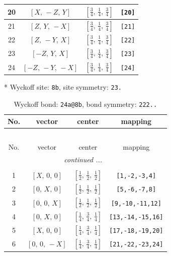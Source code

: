 \documentclass[fleqn,8pt]{jsarticle}
\begin{document}
\begin{longtable}{cccc}
20 & $\left[ X,\, - Z,\, Y \right]$ & $\left[ \frac{3}{4},\, \frac{1}{4},\, \frac{3}{4} \right]$ & {\tt [20]} \\ \hline
21 & $\left[ Z,\, Y,\, - X \right]$ & $\left[ \frac{3}{4},\, \frac{1}{4},\, \frac{3}{4} \right]$ & {\tt [21]} \\ \hline
22 & $\left[ Z,\, - Y,\, X \right]$ & $\left[ \frac{3}{4},\, \frac{1}{4},\, \frac{3}{4} \right]$ & {\tt [22]} \\ \hline
23 & $\left[ - Z,\, Y,\, X \right]$ & $\left[ \frac{3}{4},\, \frac{1}{4},\, \frac{3}{4} \right]$ & {\tt [23]} \\ \hline
24 & $\left[ - Z,\, - Y,\, - X \right]$ & $\left[ \frac{3}{4},\, \frac{1}{4},\, \frac{3}{4} \right]$ & {\tt [24]} \\
\end{longtable}
* Wyckoff site: {\tt 8b}, site symmetry: {\tt 23.}
\renewcommand{\arraystretch}{1.2}
\begin{longtable}{cccc}
\caption{Wyckoff bond: {\tt 24a@8b}, bond symmetry: {\tt 222..}}
 \\
 \hline \hline
No. & vector & center & mapping \\ \hline \endfirsthead

\multicolumn{3}{l}{\tablename\ \thetable{}} \\
 \hline \hline
No. & vector & center & mapping \\ \hline \endhead

 \hline \hline
\multicolumn{3}{r}{\footnotesize\it continued ...} \\ \endfoot

 \hline \hline
\multicolumn{3}{r}{} \\ \endlastfoot

1 & $\left[ X,\, 0,\, 0 \right]$ & $\left[ \frac{1}{2},\, \frac{1}{2},\, \frac{1}{2} \right]$ & {\tt [1,-2,-3,4]} \\ \hline
2 & $\left[ 0,\, X,\, 0 \right]$ & $\left[ \frac{1}{2},\, \frac{1}{2},\, \frac{1}{2} \right]$ & {\tt [5,-6,-7,8]} \\ \hline
3 & $\left[ 0,\, 0,\, X \right]$ & $\left[ \frac{1}{2},\, \frac{1}{2},\, \frac{1}{2} \right]$ & {\tt [9,-10,-11,12]} \\ \hline
4 & $\left[ 0,\, X,\, 0 \right]$ & $\left[ \frac{1}{4},\, \frac{3}{4},\, \frac{1}{4} \right]$ & {\tt [13,-14,-15,16]} \\ \hline
5 & $\left[ X,\, 0,\, 0 \right]$ & $\left[ \frac{1}{4},\, \frac{3}{4},\, \frac{1}{4} \right]$ & {\tt [17,-18,-19,20]} \\ \hline
6 & $\left[ 0,\, 0,\, - X \right]$ & $\left[ \frac{1}{4},\, \frac{3}{4},\, \frac{1}{4} \right]$ & {\tt [21,-22,-23,24]} \\
\end{longtable}
\end{document}
